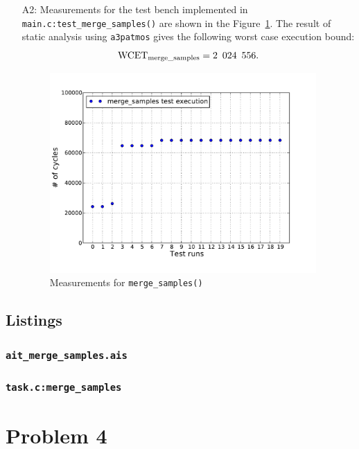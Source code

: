 \documentclass[12pt,a4paper,titlepage,oneside]{article}
\begin{document}
\begin{itemize}
\item[A2:]
  Measurements for the test bench implemented in
  \texttt{main.c:\discretionary{}{}{}test\_merge\_samples()} are shown in the
  Figure~\ref{fig:mergeSamples}.
	The result of static analysis using \texttt{a3patmos} gives the
	following worst case execution bound:
  \[
  \text{WCET}_{\text{merge\_samples}} = 2\enskip 024\enskip 556.
  \]
\begin{figure}%
  \centering
  \includegraphics[width=4in]{q3_2_merge_samples}
  \caption
  {Measurements for \texttt{merge\_samples()}}
	\label{fig:mergeSamples}
\end{figure}

\end{itemize}

\subsection{Listings}
\subsubsection{\texttt{ait\_merge\_samples.ais}}



\subsubsection{\texttt{task.c:merge\_samples}}



\newpage
\section{Problem 4}
\end{document}
